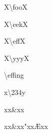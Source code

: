
X\textbackslash{}fooX\mktsShowpar\par
X\textbackslash{}eekX\mktsShowpar\par
X\textbackslash{}effX\mktsShowpar\par
X\textbackslash{}yyyX\mktsShowpar\par
\textbackslash{}effing\mktsShowpar\par
x\textbackslash{}234y\mktsShowpar\par
xx\&xx\mktsShowpar\par
xx\&xx"xxÆxx\mktsShowpar\par


